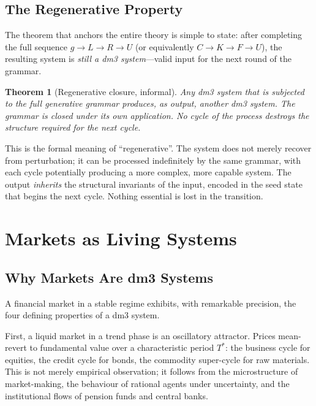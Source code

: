 \documentclass[12pt, oneside]{book}
\theoremstyle{plain}
\newtheorem{theorem}{Theorem}[chapter]
\theoremstyle{definition}
\theoremstyle{remark}
\begin{document}
\section{The Regenerative Property}

The theorem that anchors the entire theory is simple to state:
after completing the full sequence $g \to L \to R \to U$ (or
equivalently $C \to K \to F \to U$), the resulting system is
\emph{still a dm3 system}---valid input for the next round of
the grammar.

\begin{theorem}[Regenerative closure, informal]
\label{thm:regen_informal}
Any dm3 system that is subjected to the full generative grammar
produces, as output, another dm3 system. The grammar is closed
under its own application. No cycle of the process destroys
the structure required for the next cycle.
\end{theorem}

This is the formal meaning of ``regenerative''. The system does
not merely recover from perturbation; it can be processed
indefinitely by the same grammar, with each cycle potentially
producing a more complex, more capable system. The output
\emph{inherits} the structural invariants of the input,
encoded in the seed state that begins the next cycle. Nothing
essential is lost in the transition.

\chapter{Markets as Living Systems}
\label{ch:markets}

\section{Why Markets Are dm3 Systems}

A financial market in a stable regime exhibits, with remarkable
precision, the four defining properties of a dm3 system.

First, a liquid market in a trend phase is an oscillatory
attractor. Prices mean-revert to fundamental value over a
characteristic period $T^*$: the business cycle for equities,
the credit cycle for bonds, the commodity super-cycle for raw
materials. This is not merely empirical observation; it follows
from the microstructure of market-making, the behaviour of
rational agents under uncertainty, and the institutional flows
of pension funds and central banks.
\end{document}
